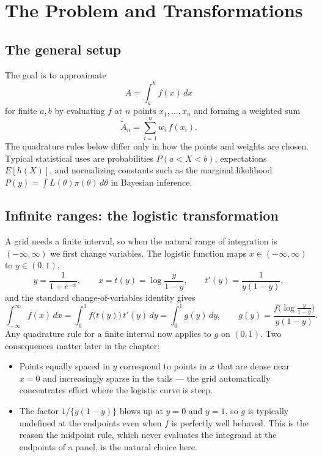 \documentclass[
  letterpaper,
  DIV=11,
  numbers=noendperiod]{scrreprt}
\providecommand{\tightlist}{%
  \setlength{\itemsep}{0pt}\setlength{\parskip}{0pt}}
\begin{document}
\section{The Problem and
Transformations}\label{the-problem-and-transformations}

\subsection{The general setup}\label{the-general-setup}

The goal is to approximate \[
A = \int_a^b f(x)\,dx
\] for finite \(a,b\) by evaluating \(f\) at \(n\) points
\(x_1,\ldots,x_n\) and forming a weighted sum \[
\tilde A_n = \sum_{i=1}^n w_i\, f(x_i).
\] The quadrature rules below differ only in how the points and weights
are chosen. Typical statistical uses are probabilities \(P(a < X < b)\),
expectations \(E[h(X)]\), and normalizing constants such as the marginal
likelihood \(P(y) = \int L(\theta)\pi(\theta)\,d\theta\) in Bayesian
inference.

\subsection{Infinite ranges: the logistic
transformation}\label{infinite-ranges-the-logistic-transformation}

A grid needs a finite interval, so when the natural range of integration
is \((-\infty,\infty)\) we first change variables. The logistic function
maps \(x \in (-\infty,\infty)\) to \(y \in (0,1)\), \[
y = \frac{1}{1+e^{-x}}, \qquad x = t(y) = \log\frac{y}{1-y}, \qquad
t'(y) = \frac{1}{y(1-y)},
\] and the standard change-of-variables identity gives \[
\int_{-\infty}^{\infty} f(x)\,dx
 = \int_0^1 f\big(t(y)\big)\,t'(y)\,dy
 = \int_0^1 g(y)\,dy, \qquad
g(y) = \frac{f\big(\log\frac{y}{1-y}\big)}{y(1-y)}.
\] Any quadrature rule for a finite interval now applies to \(g\) on
\((0,1)\). Two consequences matter later in the chapter:

\begin{itemize}
\tightlist
\item
  Points equally spaced in \(y\) correspond to points in \(x\) that are
  dense near \(x=0\) and increasingly sparse in the tails --- the grid
  automatically concentrates effort where the logistic curve is steep.
\item
  The factor \(1/\{y(1-y)\}\) blows up at \(y=0\) and \(y=1\), so \(g\)
  is typically undefined at the endpoints even when \(f\) is perfectly
  well behaved. This is the reason the midpoint rule, which never
  evaluates the integrand at the endpoints of a panel, is the natural
  choice here.
\end{itemize}
\end{document}
